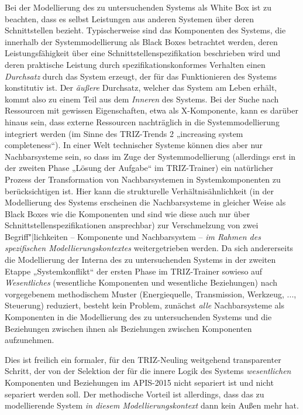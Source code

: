 \documentclass[11pt,a4paper]{article}
\begin{document}
Bei der Modellierung des zu untersuchenden Systems als White Box ist zu
beachten, dass es selbst Leistungen aus anderen Systemen über deren
Schnittstellen bezieht. Typischerweise sind das Komponenten des Systems, die
innerhalb der Systemmodellierung als Black Boxes betrachtet werden, deren
Leistungsfähigkeit über eine Schnittstellenspezifikation beschrieben wird und
deren praktische Leistung durch spezifikationskonformes Verhalten einen
\emph{Durchsatz} durch das System erzeugt, der für das Funktionieren des
Systems konstitutiv ist. Der \emph{äußere} Durchsatz, welcher das System am
Leben erhält, kommt also zu einem Teil aus dem \emph{Inneren} des Systems.
Bei der Suche nach Ressourcen mit gewissen Eigenschaften, etwa als
X-Komponente, kann es darüber hinaus sein, dass externe Ressourcen
nachträglich in die Systemmodellierung integriert werden (im Sinne des
TRIZ-Trends 2 „increasing system completeness“). In einer Welt technischer
Systeme können dies aber nur Nachbarsysteme sein, so dass im Zuge der
Systemmodellierung (allerdings erst in der zweiten Phase „Lösung der Aufgabe“
im TRIZ-Trainer) ein natürlicher Prozess der Transformation von
Nachbarsystemen in Systemkomponenten zu berücksichtigen ist. Hier kann die
strukturelle Verhältnisähnlichkeit (in der Modellierung des Systems erscheinen
die Nachbarsysteme in gleicher Weise als Black Boxes wie die Komponenten und
sind wie diese auch nur über Schnittstellenspezifikationen ansprechbar) zur
Verschmelzung von zwei Begriff"|lichkeiten -- Komponente und Nachbarsystem --
\emph{im Rahmen des spezifischen Modellierungskontextes} weitergetrieben
werden. Da sich andererseits die Modellierung der Interna des zu
untersuchenden Systems in der zweiten Etappe „Systemkonflikt“ der ersten Phase
im TRIZ-Trainer sowieso auf \emph{Wesentliches} (wesentliche Komponenten und
wesentliche Beziehungen) nach vorgegebenem methodischem Muster (Energiequelle,
Transmission, Werkzeug, ..., Steuerung) reduziert, besteht kein Problem,
zunächst \emph{alle} Nachbarsysteme als Komponenten in die Modellierung des zu
untersuchenden Systems und die Beziehungen zwischen ihnen als Beziehungen
zwischen Komponenten aufzunehmen.

Dies ist freilich ein formaler, für den TRIZ-Neuling weitgehend transparenter
Schritt, der von der Selektion der für die innere Logik des Systems
\emph{wesentlichen} Komponenten und Beziehungen im APIS-2015 nicht separiert
ist und nicht separiert werden soll.  Der methodische Vorteil ist allerdings,
dass das zu modellierende System \emph{in diesem Modellierungskontext} dann
kein Außen mehr hat.
\end{document}
